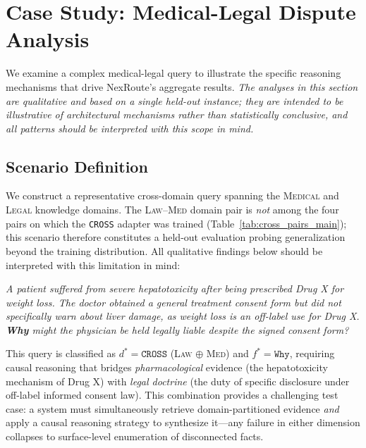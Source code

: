 \documentclass[a4paper,fleql,doubleblind]{cas-sc}
\begin{document}
\section{Case Study: Medical-Legal Dispute Analysis}
\label{sec:casestudy}
We examine a complex medical-legal query to illustrate the specific reasoning mechanisms that drive NexRoute's aggregate results. \emph{The analyses in this section are qualitative and based on a single held-out instance; they are intended to be illustrative of architectural mechanisms rather than statistically conclusive, and all patterns should be interpreted with this scope in mind.}

\subsection{Scenario Definition}
\label{ssec:scenario}
We construct a representative cross-domain query spanning the \textsc{Medical}
and \textsc{Legal} knowledge domains. The \textsc{Law}--\textsc{Med} domain
pair is \emph{not} among the four pairs on which the \texttt{CROSS} adapter
was trained (Table~\ref{tab:cross_pairs_main}); this scenario therefore
constitutes a held-out evaluation probing generalization beyond the training
distribution. All qualitative findings below should be interpreted with this
limitation in mind:
\vspace{4pt}
\begin{tcolorbox}[colback=gray!8, colframe=gray!40, arc=2pt,
  boxrule=0.5pt, left=6pt, right=6pt, top=4pt, bottom=4pt]
\small\itshape
A patient suffered from severe hepatotoxicity after being prescribed Drug X
for weight loss. The doctor obtained a general treatment consent form but did
not specifically warn about liver damage, as weight loss is an off-label use
for Drug X. \textbf{Why} might the physician be held legally liable despite
the signed consent form?
\end{tcolorbox}
\vspace{4pt}
\noindent
This query is classified as $d^* = \texttt{CROSS}$ (\textsc{Law} $\oplus$
\textsc{Med}) and $f^* = \texttt{Why}$, requiring causal reasoning that bridges
\textit{pharmacological} evidence (the hepatotoxicity mechanism of Drug X) with
\textit{legal doctrine} (the duty of specific disclosure under off-label
informed consent law). This combination provides a challenging test case: a
system must simultaneously retrieve domain-partitioned evidence \emph{and}
apply a causal reasoning strategy to synthesize it---any failure in either
dimension collapses to surface-level enumeration of disconnected facts.
\end{document}
